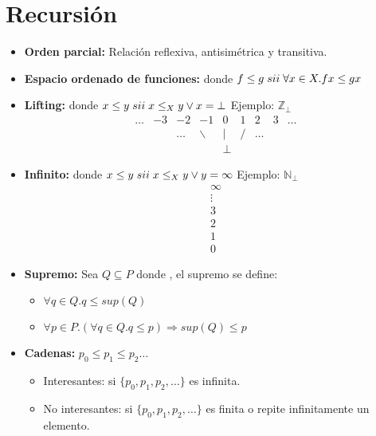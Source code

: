 \section{Recursión}
\begin{itemize}
  \item \textbf{Orden parcial:} Relación reflexiva, antisimétrica y transitiva.
  \item \textbf{Espacio ordenado de funciones:}  \entonces {} donde $f \leq g \; sii \; \forall x \in X. f x \leq g x$
  \item \textbf{Lifting:}  \entonces {} donde $x \leq y \; sii \; x \leq_{X} y \vee x = \bot$
    \PN Ejemplo: $\mathbb{Z}_{\bot}$
    \[
      \begin{array}{crrrclccc}
          \ldots & -3 & -2 & -1& 0 &1& 2& 3& \ldots \\
                      &      &  \ldots  &  \backslash   &  | & / & \ldots \\
                      &     &      &     & \perp
      \end{array}
    \]
  \item \textbf{Infinito:}  \entonces {} donde $x \leq y \; sii \; x \leq_{X} y \vee y = \infty$
    \PN Ejemplo: $\mathbb{N}_{\bot}$
    \[
      \begin{array}{c}
      \infty \\
        \vdots \\
        3 \\
        2 \\
        1 \\
        0
      \end{array}
    \]
  \item \textbf{Supremo:} Sea $Q \subseteq P$ donde , el supremo se define:
    \begin{itemize}
      \item $\forall q \in Q. q \leq sup(Q)$
      \item $\forall p \in P.(\forall q \in Q. q \leq p) \Rightarrow sup(Q) \leq p$
    \end{itemize}
  \item \textbf{Cadenas:} $p_0 \leq p_1 \leq p_2 \dotsc$
    \begin{itemize}
      \item Interesantes: si $\{p_0, p_1, p_2, \dotsc\}$ es infinita.
      \item No interesantes: si $\{p_0, p_1, p_2, \dotsc\}$ es finita o repite infinitamente un elemento.

\end{itemize}
\end{itemize}
